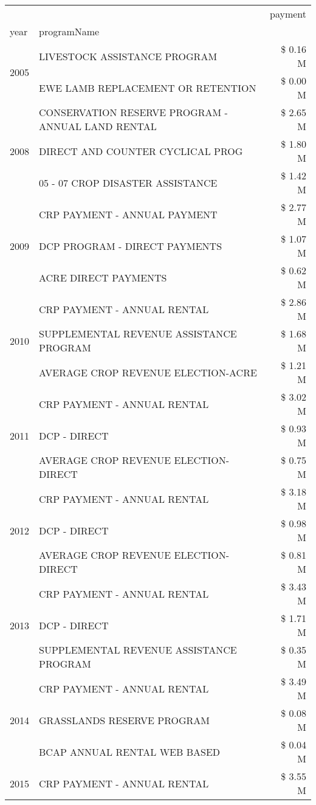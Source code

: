 \begin{tabular}{llr}
\toprule
 &  & payment \\
year & programName &  \\
\midrule
\multirow[t]{2}{*}{2005} & LIVESTOCK ASSISTANCE PROGRAM & \$ 0.16 M \\
 & EWE LAMB REPLACEMENT OR RETENTION & \$ 0.00 M \\
\cline{1-3}
\multirow[t]{3}{*}{2008} & CONSERVATION RESERVE PROGRAM - ANNUAL LAND RENTAL & \$ 2.65 M \\
 & DIRECT AND COUNTER CYCLICAL PROG & \$ 1.80 M \\
 & 05 - 07 CROP DISASTER ASSISTANCE & \$ 1.42 M \\
\cline{1-3}
\multirow[t]{3}{*}{2009} & CRP PAYMENT - ANNUAL PAYMENT & \$ 2.77 M \\
 & DCP PROGRAM - DIRECT PAYMENTS & \$ 1.07 M \\
 & ACRE DIRECT PAYMENTS & \$ 0.62 M \\
\cline{1-3}
\multirow[t]{3}{*}{2010} & CRP PAYMENT - ANNUAL RENTAL & \$ 2.86 M \\
 & SUPPLEMENTAL REVENUE ASSISTANCE PROGRAM & \$ 1.68 M \\
 & AVERAGE CROP REVENUE ELECTION-ACRE & \$ 1.21 M \\
\cline{1-3}
\multirow[t]{3}{*}{2011} & CRP PAYMENT - ANNUAL RENTAL & \$ 3.02 M \\
 & DCP - DIRECT & \$ 0.93 M \\
 & AVERAGE CROP REVENUE ELECTION-DIRECT & \$ 0.75 M \\
\cline{1-3}
\multirow[t]{3}{*}{2012} & CRP PAYMENT - ANNUAL RENTAL & \$ 3.18 M \\
 & DCP - DIRECT & \$ 0.98 M \\
 & AVERAGE CROP REVENUE ELECTION-DIRECT & \$ 0.81 M \\
\cline{1-3}
\multirow[t]{3}{*}{2013} & CRP PAYMENT - ANNUAL RENTAL & \$ 3.43 M \\
 & DCP - DIRECT & \$ 1.71 M \\
 & SUPPLEMENTAL REVENUE ASSISTANCE PROGRAM & \$ 0.35 M \\
\cline{1-3}
\multirow[t]{3}{*}{2014} & CRP PAYMENT - ANNUAL RENTAL & \$ 3.49 M \\
 & GRASSLANDS RESERVE PROGRAM & \$ 0.08 M \\
 & BCAP ANNUAL RENTAL WEB BASED & \$ 0.04 M \\
\cline{1-3}
\multirow[t]{3}{*}{2015} & CRP PAYMENT - ANNUAL RENTAL & \$ 3.55 M \\

\end{tabular}

